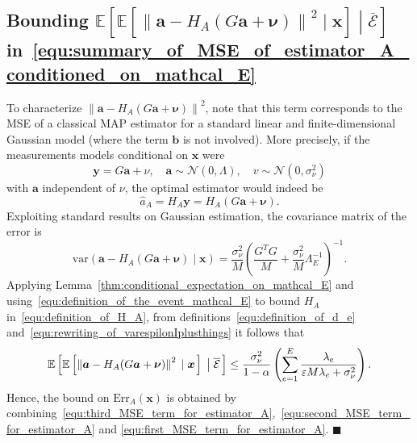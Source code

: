 \documentclass[10pt,twocolumn,twoside]{IEEEtran}					%
\theoremstyle	{plain}
\newcommand{\Expectation}					[0]	{\mathbb{E}}
\newcommand{\ExpectationOf}					[1]	{\Expectation \left[ #1 \right]}
\newcommand{\ExpectationOfGiven}			[2]	{\ExpectationOf{ #1 \; \left| \; #2 \right. }}
\newcommand{\Variance}				[0]	{\mathrm{var}}
\newcommand{\VarianceOf}			[1]	{\Variance \left( #1 \right)}
\newcommand{\VarianceOfGiven}		[2]	{\VarianceOf{ #1 \; \left| \; #2 \right. }}
\newcommand	{\Lemma}				[0]	{Lemma}
\begin{document}
\subsection*{Bounding $\ExpectationOfGiven{ \ExpectationOfGiven{ \left\| \bm{a} - H_{A} ( G \bm{a} + \bm{\nu} ) \right\|^{2} }{\bm{x}}}{\overline{\mathcal{E}}}$ in~\eqref{equ:summary_of_MSE_of_estimator_A_conditioned_on_mathcal_E}}
\label{ssec:characterization_of_second_term_of_f_A_conditioned_on_mathcal_E}

To characterize $\left\| \bm{a} - H_{A} ( G \bm{a} + \bm{\nu} ) \right\|^{2}$, note that this term corresponds to the \ac{MSE} of a classical \ac{MAP} estimator for a standard linear and finite-dimensional Gaussian model (where the term $\bm{b}$ is not involved). More precisely, if the measurements models conditional on $\bm{x}$ were
%
\begin{equation}
\bm{y}= G\bm{a} +\nu, \quad \bm{a} \sim\mathcal{N}(0,\Lambda), \quad v \sim\mathcal{N}(0,\sigma_{\nu}^2)
	\label{StandardModelA}
\end{equation}
%
with $\bm{a}$ independent of $\nu$, the optimal estimator would indeed be
%
\begin{equation}
	\widehat{a}_A = H_A \bm{y} = H_A( G \bm{a} + \bm{\nu} ).
	\label{StandardEstA}
\end{equation}
%
Exploiting standard results on Gaussian estimation, the covariance matrix of the error is
%
\begin{equation}
	\VarianceOfGiven{ \bm{a} - H_{A} ( G \bm{a} + \bm{\nu} )}{\bm{x} }
	=
	\frac{\sigma^{2}_{\nu}}{M}
	\left( \frac{G^{T} G}{M} + \frac{\sigma^{2}_{\nu}}{M} \Lambda^{-1}_{E} \right)^{-1} .
	\label{StandardVar}
\end{equation}
%
Applying \Lemma~\ref{thm:conditional_expectation_on_mathcal_E} and using~\eqref{equ:definition_of_the_event_mathcal_E} to bound $H_{A}$ in~\eqref{equ:definition_of_H_A}, from definitions~\eqref{equ:definition_of_d_e} and~\eqref{equ:rewriting_of_varespilonIplusthings} it follows that
%
\begin{equation} \footnotesize
	\ExpectationOfGiven{ \ExpectationOfGiven{ \left\| \bm{a} - H_{A} ( G \bm{a} + \bm{\nu} ) \right\|^{2} }{\bm{x}}}{\overline{\mathcal{E}}}
	\leq
	\frac{\sigma^{2}_{\nu}}{1-\alpha}
	\left(
		\sum_{e = 1}^{E}
		\frac{\lambda_e}{\varepsilon M \lambda_e + \sigma^{2}_{\nu}}
	\right) .
	\label{equ:first_MSE_term_for_estimator_A}
\end{equation}
%
Hence, the bound on $\mathrm{Err}_{A}(\bm{x})$ is obtained by combining~\eqref{equ:third_MSE_term_for_estimator_A},~\eqref{equ:second_MSE_term_for_estimator_A} and \eqref{equ:first_MSE_term_for_estimator_A}. \hfill $\blacksquare$
\end{document}
